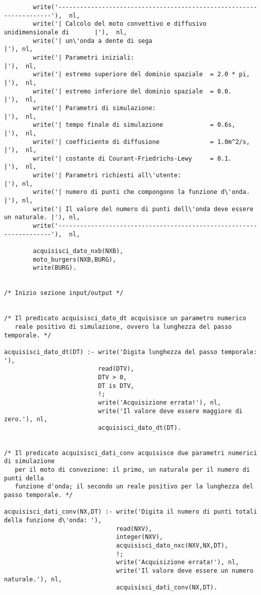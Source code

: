 \begin{verbatim}
        write('--------------------------------------------------------------------'),  nl,
        write('| Calcolo del moto convettivo e diffusivo unidimensionale di       |'),  nl,
        write('| un\'onda a dente di sega                                          |'), nl,
        write('| Parametri iniziali:                                              |'),  nl,
        write('| estremo superiore del dominio spaziale  = 2.0 * pi,              |'),  nl,
        write('| estremo inferiore del dominio spaziale  = 0.0.                   |'),  nl, 
        write('| Parametri di simulazione:                                        |'),  nl,
        write('| tempo finale di simulazione             = 0.6s,                  |'),  nl, 
        write('| coefficiente di diffusione              = 1.0m^2/s,              |'),  nl, 
        write('| costante di Courant-Friedrichs-Lewy     = 0.1.                   |'),  nl, 
        write('| Parametri richiesti all\'utente:                                  |'), nl, 
        write('| numero di punti che compongono la funzione d\'onda.               |'), nl,
        write('| Il valore del numero di punti dell\'onda deve essere un naturale. |'), nl,
        write('--------------------------------------------------------------------'),  nl,

        acquisisci_dato_nxb(NXB),                                                          
        moto_burgers(NXB,BURG),
        write(BURG).


/* Inizio sezione input/output */
   

/* Il predicato acquisisci_dato_dt acquisisce un parametro numerico
   reale positivo di simulazione, ovvero la lunghezza del passo temporale. */

acquisisci_dato_dt(DT) :- write('Digita lunghezza del passo temporale: '),
                          read(DTV),
                          DTV > 0,
                          DT is DTV,
                          !;     
                          write('Acquisizione errata!'), nl,
                          write('Il valore deve essere maggiore di zero.'), nl,
                          acquisisci_dato_dt(DT).


/* Il predicato acquisisci_dati_conv acquisisce due parametri numerici di simulazione 
   per il moto di convezione: il primo, un naturale per il numero di punti della 
   funzione d'onda; il secondo un reale positivo per la lunghezza del passo temporale. */

acquisisci_dati_conv(NX,DT) :- write('Digita il numero di punti totali della funzione d\'onda: '),
                               read(NXV),
                               integer(NXV),
                               acquisisci_dato_nxc(NXV,NX,DT),
                               !;     
                               write('Acquisizione errata!'), nl,
                               write('Il valore deve essere un numero naturale.'), nl,
                               acquisisci_dati_conv(NX,DT).


\end{verbatim}
